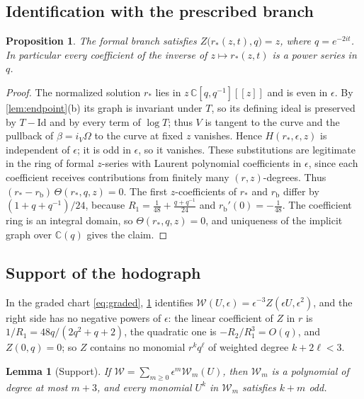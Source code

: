 \documentclass[11pt]{amsart}
\numberwithin{equation}{section}
\newtheorem{proposition}[theorem]{Proposition}
\newtheorem{lemma}[theorem]{Lemma}
\theoremstyle{definition}
\theoremstyle{remark}
\newcommand{\C}{\mathbb{C}}
\newcommand{\rb}{r_{\mathrm b}}
\newcommand{\Id}{\mathrm{Id}}
\begin{document}
\subsection{Identification with the prescribed branch}

\begin{proposition}\label{prop:ident}
The formal branch satisfies $Z\bigl(r_*(z,t),q\bigr)=z$, where $q=e^{-2it}$. In particular every coefficient of the inverse of $z\mapsto r_*(z,t)$ is a power series in $q$.
\end{proposition}

\begin{proof}
The normalized solution $r_*$ lies in $z\,\C[q,q^{-1}][[z]]$ and is even in $\epsilon$. By \cref{lem:endpoint}(b) its graph is invariant under $T$, so its defining ideal is preserved by $T-\Id$ and by every term of $\log T$; thus $V$ is tangent to the curve and the pullback of $\beta=i_V\Omega$ to the curve at fixed $z$ vanishes. Hence $H(r_*,\epsilon,z)$ is independent of $\epsilon$; it is odd in $\epsilon$, so it vanishes. These substitutions are legitimate in the ring of formal $z$-series with Laurent polynomial coefficients in $\epsilon$, since each coefficient receives contributions from finitely many $(r,z)$-degrees. Thus $(r_*-\rb)\,\Theta(r_*,q,z)=0$. The first $z$-coefficients of $r_*$ and $\rb$ differ by $(1+q+q^{-1})/24$, because $R_1=\frac1{48}+\frac{q+q^{-1}}{24}$ and $\rb'(0)=-\frac1{48}$. The coefficient ring is an integral domain, so $\Theta(r_*,q,z)=0$, and uniqueness of the implicit graph over $\C(q)$ gives the claim.
\end{proof}

\subsection{Support of the hodograph}
In the graded chart \eqref{eq:graded}, \cref{prop:ident} identifies $\mathcal W(U,\epsilon)=\epsilon^{-3}Z(\epsilon U,\epsilon^2)$, and the right side has no negative powers of $\epsilon$: the linear coefficient of $Z$ in $r$ is $1/R_1=48q/(2q^2+q+2)$, the quadratic one is $-R_2/R_1^3=O(q)$, and $Z(0,q)=0$; so $Z$ contains no monomial $r^kq^\ell$ of weighted degree $k+2\ell<3$.

\begin{lemma}[Support]\label{lem:support}
If $\mathcal W=\sum_{m\ge0}\epsilon^m\mathcal W_m(U)$, then $\mathcal W_m$ is a polynomial of degree at most $m+3$, and every monomial $U^k$ in $\mathcal W_m$ satisfies $k+m$ odd.
\end{lemma}
\end{document}

